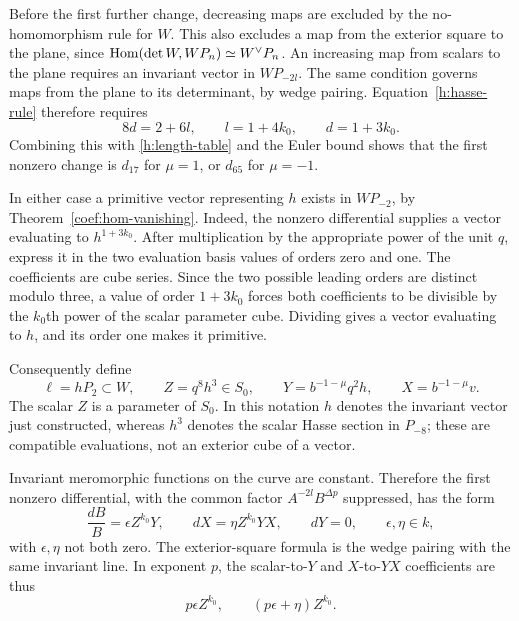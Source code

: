 Before the first further change, decreasing maps are excluded by the
no-homomorphism rule for $W$. This also excludes a map from the
exterior square to the plane, since
$\operatorname{Hom}(\det W,WP_n)\simeq W^{\vee}P_n$.
An increasing map from scalars to the plane requires an invariant
vector in $WP_{-2l}$. The same condition governs maps from the plane
to its determinant, by wedge pairing. Equation~\eqref{h:hasse-rule}
therefore requires
\begin{equation}
 \label{h:first-hasse-degree}
 8d=2+6l,\qquad l=1+4k_0,\qquad d=1+3k_0.
\end{equation}
Combining this with \eqref{h:length-table} and the Euler bound shows
that the first nonzero change is $d_{17}$ for $\mu=1$, or $d_{65}$
for $\mu=-1$.

In either case a primitive vector representing $h$ exists in $WP_{-2}$,
by Theorem~\ref{coef:hom-vanishing}.
Indeed, the nonzero differential supplies a vector evaluating to
$h^{1+3k_0}$. After multiplication by the appropriate power of the
unit $q$, express it in the two evaluation basis values of orders zero
and one. The coefficients are cube series. Since the two possible
leading orders are distinct modulo three, a value of order
$1+3k_0$ forces both coefficients to be divisible by the $k_0$th
power of the scalar parameter cube. Dividing gives a vector evaluating
to $h$, and its order one makes it primitive.

Consequently define
\begin{equation}
 \label{h:xyz}
 \ell=hP_2\subset W,\qquad Z=q^8h^3\in S_0,
 \qquad Y=b^{-1-\mu}q^2h,\qquad X=b^{-1-\mu}v.
\end{equation}
The scalar $Z$ is a parameter of $S_0$. In this notation $h$ denotes
the invariant vector just constructed, whereas $h^3$ denotes the
scalar Hasse section in $P_{-8}$; these are compatible evaluations,
not an exterior cube of a vector.

Invariant meromorphic functions on the curve are constant. Therefore
the first nonzero differential, with the common factor
$A^{-2l}B^{\Delta p}$ suppressed, has the form
\begin{equation}
 \label{h:first-plane-differential}
 \frac{dB}{B}=\epsilon Z^{k_0}Y,
 \qquad dX=\eta Z^{k_0}YX,
 \qquad dY=0,
 \qquad \epsilon,\eta\in k,
\end{equation}
with $\epsilon,\eta$ not both zero. The exterior-square formula is
the wedge pairing with the same invariant line. In exponent $p$, the
scalar-to-$Y$ and $X$-to-$YX$ coefficients are thus
\begin{equation}
 \label{h:first-plane-coefficients}
 p\epsilon Z^{k_0},\qquad(p\epsilon+\eta)Z^{k_0}.
\end{equation}

